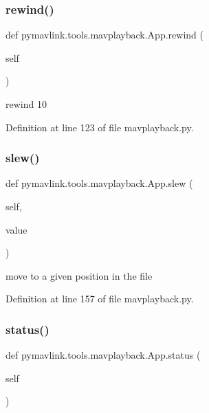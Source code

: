 \begin{DoxyVerb}
\subsubsection{\texorpdfstring{rewind()}{rewind()}}
{\footnotesize\ttfamily def pymavlink.\+tools.\+mavplayback.\+App.\+rewind (\begin{DoxyParamCaption}\item[{}]{self }\end{DoxyParamCaption})}

\begin{DoxyVerb}rewind 10%
 

Definition at line 123 of file mavplayback.\+py.

\mbox{\label{classpymavlink_1_1tools_1_1mavplayback_1_1App_a146a9c59d441295f276aa2bab3b8aa63}} 
\subsubsection{\texorpdfstring{slew()}{slew()}}
{\footnotesize\ttfamily def pymavlink.\+tools.\+mavplayback.\+App.\+slew (\begin{DoxyParamCaption}\item[{}]{self,  }\item[{}]{value }\end{DoxyParamCaption})}

\begin{DoxyVerb}move to a given position in the file\end{DoxyVerb}
 

Definition at line 157 of file mavplayback.\+py.

\mbox{\label{classpymavlink_1_1tools_1_1mavplayback_1_1App_ab09676f5e32cc2023ce9bf476418ee21}} 
\subsubsection{\texorpdfstring{status()}{status()}}
{\footnotesize\ttfamily def pymavlink.\+tools.\+mavplayback.\+App.\+status (\begin{DoxyParamCaption}\item[{}]{self }\end{DoxyParamCaption})}


\end{DoxyVerb}
\end{DoxyVerb}
